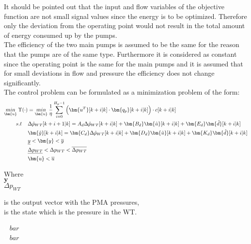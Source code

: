 It should be pointed out that the input and flow variables of the objective function are not small signal values since the energy is to be optimized. Therefore only the deviation from the operating point would not result in the total amount of energy consumed up by the pumps. 
\\
The efficiency of the two main pumps is assumed to be the same for the reason that the pumps are of the same type. Furthermore it is considered as constant since the operating point is the same for the main pumps and it is assumed that for small deviations in flow and pressure the efficiency does not change significantly. 
\\
The control problem can be formulated as a minimization problem of the form:
\begin{align}
\underset{\bm{u}}{min} \:  \Upsilon(\cdot) &= \underset{\bm{u}}{min} \: \frac{1}{\eta} \sum_{i=0}^{H_p-1} \Big( \bm{u^T}[k+i|k] \cdot \bm{q_{p}}[k+i|k]\Big)\cdot c[k+i|k] \label{eqcost1} \\
%
\newline
s.t \:\:\:\:\: & \Delta \hat{p}_{WT} [k+i+1|k] = A_d \Delta \hat{p}_{WT}[k+i|k]  + \bm{B_d} \bm{\hat{u}}[k+i|k] + \bm{E_d} \bm{\hat{d}}[k+i|k] \label{dyn}  \\ 
%
&\bm{\hat{y}}[k+i|k] = \bm{C_d} \Delta \hat{p}_{WT}[k+i|k] + \bm{D_d} \bm{\hat{u}}[k+i|k] + \bm{K_d} \bm{\hat{d}}[k+i|k] \\
%
& \underline{y} < \bm{y} < \overline{y} \\
%
& \underline{\Delta p_{WT}} < \Delta p_{WT} < \overline{\Delta p_{WT}} \\
%
& \bm{u} < \overline{u} \label{eqconst2} 
\end{align}

 \begin{minipage}[t]{0.24\textwidth}
 Where\\
 \hspace*{8mm} $\bm{y}$ \\
 \hspace*{8mm} $\Delta p_{WT}$ 
 \end{minipage}
 \begin{minipage}[t]{0.63\textwidth}
 \vspace*{2mm}
 is the output vector with the PMA pressures,\\
 is the state which is the pressure in the WT.
 \end{minipage}
 \begin{minipage}[t]{0.10\textwidth}
 \vspace*{2mm}
 \textcolor{White}{te}$\unit{bar}$\\
 \textcolor{White}{te}$\unit{bar}$
 \end{minipage}


